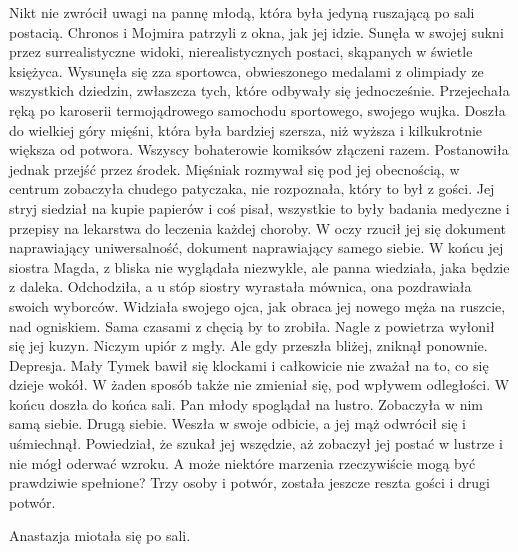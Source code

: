 Nikt nie zwrócił uwagi na pannę młodą, która była jedyną ruszającą po sali postacią. Chronos i Mojmira patrzyli z okna, jak jej idzie.
Sunęła w swojej sukni przez surrealistyczne widoki, nierealistycznych postaci, skąpanych w świetle księżyca.
Wysunęła się zza sportowca, obwieszonego medalami z olimpiady ze wszystkich dziedzin, zwłaszcza tych, które odbywały się jednocześnie.
Przejechała ręką po karoserii termojądrowego samochodu sportowego, swojego wujka.
Doszła do wielkiej góry mięśni, która była bardziej szersza, niż wyższa i kilkukrotnie większa od potwora. Wszyscy bohaterowie komiksów złączeni razem.
Postanowiła jednak przejść przez środek. Mięśniak rozmywał się pod jej obecnością, w centrum zobaczyła chudego patyczaka, nie rozpoznała, który to był z gości.
Jej stryj siedział na kupie papierów i coś pisał, wszystkie to były badania medyczne i przepisy na lekarstwa do leczenia każdej choroby.
W oczy rzucił jej się dokument naprawiający uniwersalność, dokument naprawiający samego siebie.
W końcu jej siostra Magda, z bliska nie wyglądała niezwykle, ale panna wiedziała, jaka będzie z daleka. 
Odchodziła, a u stóp siostry wyrastała mównica, ona pozdrawiała swoich wyborców.
Widziała swojego ojca, jak obraca jej nowego męża na ruszcie, nad ogniskiem. Sama czasami z chęcią by to zrobiła.
Nagle z powietrza wyłonił się jej kuzyn. Niczym upiór z mgły.
Ale gdy przeszła bliżej, zniknął ponownie. Depresja.
Mały Tymek bawił się klockami i całkowicie nie zważał na to, co się dzieje wokół. W żaden sposób także nie zmieniał się, pod wpływem odległości.
W końcu doszła do końca sali. Pan młody spoglądał na lustro. Zobaczyła w nim samą siebie. Drugą siebie.
Weszła w swoje odbicie, a jej mąż odwrócił się i uśmiechnął. Powiedział, że szukał jej wszędzie, aż zobaczył jej postać w lustrze i nie mógł oderwać wzroku.
A może niektóre marzenia rzeczywiście mogą być prawdziwie spełnione?
Trzy osoby i potwór, została jeszcze reszta gości i drugi potwór.

Anastazja miotała się po sali.

